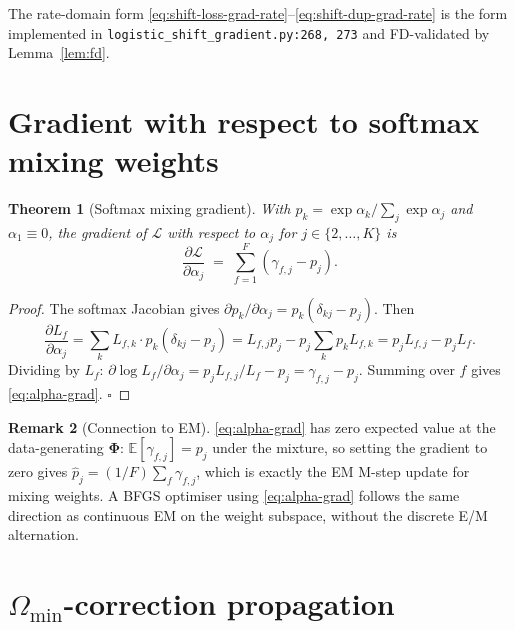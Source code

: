 \documentclass[11pt]{article}
\newcommand{\E}{\mathbb{E}}
\newcommand{\Ll}{\mathcal{L}}
\newcommand{\Om}{\Omega}
\newtheorem{theorem}{Theorem}
\theoremstyle{definition}
\newtheorem{remark}[theorem]{Remark}
\begin{document}
\noindent The rate-domain form
\eqref{eq:shift-loss-grad-rate}--\eqref{eq:shift-dup-grad-rate} is
the form implemented in
\texttt{logistic\_shift\_gradient.py:268,~273} and FD-validated by
Lemma~\ref{lem:fd}.

\section{Gradient with respect to softmax mixing weights}
\label{sec:alpha-grad}

\begin{theorem}[Softmax mixing gradient]\label{thm:alpha-grad}
With $p_k = \exp\alpha_k / \sum_j \exp\alpha_j$ and $\alpha_1 \equiv 0$,
the gradient of $\Ll$ with respect to $\alpha_j$ for $j\in\{2,\dots,K\}$ is
\begin{equation}
\frac{\partial \Ll}{\partial \alpha_j}
\;=\;
\sum_{f=1}^F (\gamma_{f,j} - p_j).
\label{eq:alpha-grad}
\end{equation}
\end{theorem}
\begin{proof}
The softmax Jacobian gives
$\partial p_k / \partial \alpha_j = p_k(\delta_{kj} - p_j)$. Then
\begin{equation*}
\frac{\partial L_f}{\partial \alpha_j}
= \sum_k L_{f,k} \cdot p_k(\delta_{kj} - p_j)
= L_{f,j} p_j - p_j \sum_k p_k L_{f,k}
= p_j L_{f,j} - p_j L_f.
\end{equation*}
Dividing by $L_f$:
$\partial \log L_f / \partial \alpha_j
= p_j L_{f,j}/L_f - p_j = \gamma_{f,j} - p_j$. Summing over $f$
gives \eqref{eq:alpha-grad}. $\square$
\end{proof}

\begin{remark}[Connection to EM]
\label{rem:em-connection}
\eqref{eq:alpha-grad} has zero expected value at the
data-generating $\bm\Phi$: $\E[\gamma_{f,j}] = p_j$ under the
mixture, so setting the gradient to zero gives
$\hat p_j = (1/F)\sum_f \gamma_{f,j}$, which is exactly the EM
M-step update for mixing weights.  A BFGS optimiser using
\eqref{eq:alpha-grad} follows the same direction as continuous EM
on the weight subspace, without the discrete E/M alternation.
\end{remark}

\section{$\Om_{\min}$-correction propagation}
\label{sec:l0-grad}
\end{document}
